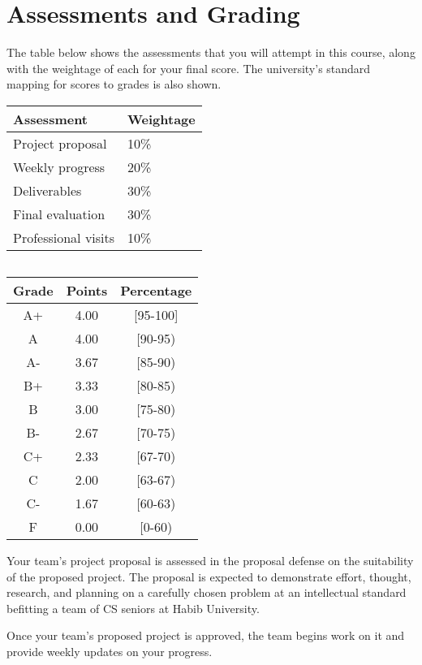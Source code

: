 \documentclass[a4paper]{article}
\newcommand{\new}[1]{{#1}}
\begin{document}
\section{Assessments and Grading}

The table below shows the assessments that you will attempt in this course, along with the weightage of each for your final score. The university's standard mapping for scores to grades is also shown.

\begin{center}
\begin{tabular}{|l|l|}
  \hline
  \textbf{Assessment} & \textbf{Weightage} \\\hline\hline
  Project proposal & 10\% \\\hline
  Weekly progress & 20\% \\\hline
  Deliverables & 30\% \\\hline
  Final evaluation & 30\% \\\hline
  Professional visits & 10\% \\\hline
\end{tabular}
$\quad$
  \begin{tabular}{|*3{c|}}
\hline
\textbf{Grade} & \textbf{Points} & \textbf{Percentage}\\\hline\hline
A+ & 4.00 & [95-100] \\\hline
A & 4.00 & [90-95) \\\hline
A- & 3.67 & [85-90) \\\hline
B+ & 3.33 & [80-85) \\\hline
B & 3.00 & [75-80) \\\hline
B- & 2.67 & [70-75) \\\hline
C+ & 2.33 & [67-70) \\\hline
C & 2.00 & [63-67) \\\hline
C- & 1.67 & [60-63) \\\hline
F & 0.00 & [0-60) \\\hline
  \end{tabular}
\end{center}

\new{Your team's project proposal is assessed in the proposal defense on the suitability of the proposed project. The proposal is expected to demonstrate effort, thought, research, and planning on a carefully chosen problem at an intellectual standard befitting a team of CS seniors at Habib University.}

\new{Once your team's proposed project is approved, the team begins work on it and provide weekly updates on your progress.}
\end{document}

